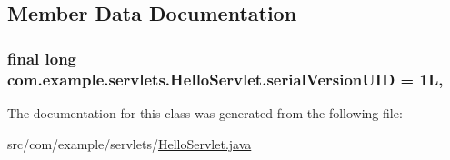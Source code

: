 \subsection{Member Data Documentation}
\subsubsection[{\texorpdfstring{serial\+Version\+U\+ID}{serialVersionUID}}]{\setlength{\rightskip}{0pt plus 5cm}final long com.\+example.\+servlets.\+Hello\+Servlet.\+serial\+Version\+U\+ID = 1L\hspace{0.3cm}{\ttfamily [static]}, {\ttfamily [private]}}\hypertarget{classcom_1_1example_1_1servlets_1_1_hello_servlet_aee3a8f698be2149a6d0c401ab648cf82}{}\label{classcom_1_1example_1_1servlets_1_1_hello_servlet_aee3a8f698be2149a6d0c401ab648cf82}


The documentation for this class was generated from the following file\+:\begin{DoxyCompactItemize}
\item 
src/com/example/servlets/\hyperlink{_hello_servlet_8java}{Hello\+Servlet.\+java}\end{DoxyCompactItemize}
